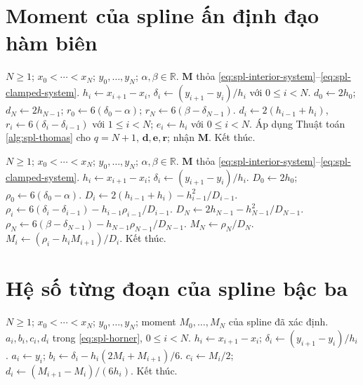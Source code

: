 \documentclass[12pt,a4paper,oneside]{book}
\numberwithin{algorithm}{chapter}
\theoremstyle{definition}
\newcommand{\R}{\mathbb{R}}
\begin{document}
\section{Moment của spline ấn định đạo hàm biên}
\begin{algorithm}[H]
\caption{Dựng moment với đạo hàm biên -- sơ lược}
\label{alg:spl-clamped}
\begin{algorithmic}[1]
\Require $N\geq1$; $x_0<\cdots<x_N$; $y_0,\ldots,y_N$; $\alpha,\beta\in\R$.
\Ensure $\mathbf M$ thỏa \eqref{eq:spl-interior-system}--\eqref{eq:spl-clamped-system}.
\State $h_i\gets x_{i+1}-x_i$, $\delta_i\gets(y_{i+1}-y_i)/h_i$ với $0\leq i<N$.
\State $d_0\gets2h_0$; $d_N\gets2h_{N-1}$; $r_0\gets6(\delta_0-\alpha)$; $r_N\gets6(\beta-\delta_{N-1})$.
\State $d_i\gets2(h_{i-1}+h_i)$, $r_i\gets6(\delta_i-\delta_{i-1})$ với $1\leq i<N$; $e_i\gets h_i$ với $0\leq i<N$.
\State Áp dụng Thuật toán \ref{alg:spl-thomas} cho $q=N+1$, $\boldsymbol d,\boldsymbol e,\mathbf r$; nhận $\mathbf M$.
\State Kết thúc.
\end{algorithmic}
\end{algorithm}

\begin{algorithm}[H]
\caption{Dựng moment với đạo hàm biên -- chi tiết}
\label{alg:spl-clamped-detailed}
\begin{algorithmic}[1]
\Require $N\geq1$; $x_0<\cdots<x_N$; $y_0,\ldots,y_N$; $\alpha,\beta\in\R$.
\Ensure $\mathbf M$ thỏa \eqref{eq:spl-interior-system}--\eqref{eq:spl-clamped-system}.
  \State $h_i\gets x_{i+1}-x_i$; $\delta_i\gets(y_{i+1}-y_i)/h_i$.
\EndFor
\Statex
\State $D_0\gets2h_0$; $\rho_0\gets6(\delta_0-\alpha)$.
  \State $D_i\gets2(h_{i-1}+h_i)-h_{i-1}^2/D_{i-1}$.
  \State $\rho_i\gets6(\delta_i-\delta_{i-1})-h_{i-1}\rho_{i-1}/D_{i-1}$.
\EndFor
\Statex
\State $D_N\gets2h_{N-1}-h_{N-1}^2/D_{N-1}$.
\State $\rho_N\gets6(\beta-\delta_{N-1})-h_{N-1}\rho_{N-1}/D_{N-1}$.
\State $M_N\gets\rho_N/D_N$.
  \State $M_i\gets(\rho_i-h_iM_{i+1})/D_i$.
\EndFor
\Statex
\State Kết thúc.
\end{algorithmic}
\end{algorithm}

\section{Hệ số từng đoạn của spline bậc ba}
\begin{algorithm}[H]
\caption{Dựng hệ số Horner từng đoạn}
\label{alg:spl-coefficients}
\begin{algorithmic}[1]
\Require $N\geq1$; $x_0<\cdots<x_N$; $y_0,\ldots,y_N$; moment $M_0,\ldots,M_N$ của spline đã xác định.
\Ensure $a_i,b_i,c_i,d_i$ trong \eqref{eq:spl-horner}, $0\leq i<N$.
  \State $h_i\gets x_{i+1}-x_i$; $\delta_i\gets(y_{i+1}-y_i)/h_i$.
  \State $a_i\gets y_i$; $b_i\gets\delta_i-h_i(2M_i+M_{i+1})/6$.
  \State $c_i\gets M_i/2$; $d_i\gets(M_{i+1}-M_i)/(6h_i)$.
\EndFor
\Statex
\State Kết thúc.
\end{algorithmic}
\end{algorithm}
\end{document}
